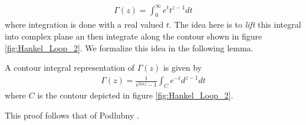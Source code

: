 \begin{align}
    \Gamma(z) = \int_0^\infty e^t t^{z-1} dt
\end{align}
where integration is done with a real valued $ t $. The idea here is to \emph{lift} this integral into
complex plane an then integrate along the contour shown in figure \ref{fig:Hankel_Loop_2}. We formalize 
this idea in the following lemma.

\begin{lemma}
    \label{lem:contour_gamma}
    A contour integral representation of $ \Gamma(z) $ is given by
    \begin{align}
        \Gamma(z) = \frac{1}{e^{2 \pi i z} - 1} \int_{C} e^{-t}d^{z-1} dt
    \end{align}
where $ C $ is the contour depicted in figure \ref{fig:Hankel_Loop_2}.
\end{lemma}
This proof follows that of Podlubny \cite{Podlubny1999}.

